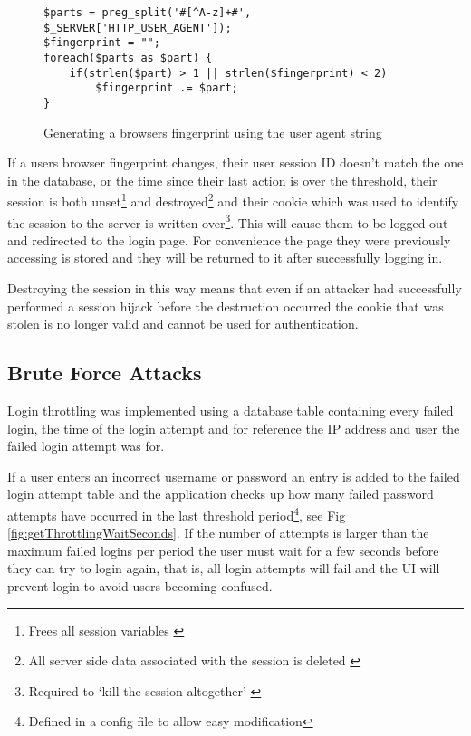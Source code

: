 \begin{figure}
\centering
\begin{lstlisting}[style=phpcolor]
$parts = preg_split('#[^A-z]+#', $_SERVER['HTTP_USER_AGENT']);
$fingerprint = "";
foreach($parts as $part) {
	if(strlen($part) > 1 || strlen($fingerprint) < 2)
		$fingerprint .= $part;
}
\end{lstlisting}
\caption{Generating a browsers fingerprint using the user agent string}
\label{fig:fingerprinting}
\end{figure}

If a users browser fingerprint changes, their user session ID doesn't match the one in the database, or the time since their last action is over the threshold, their session is both unset\footnote{Frees all session variables \parencite{php2014sessionunset}} and destroyed\footnote{All server side data associated with the session is deleted \parencite{php2014sessiondesroy}} and their cookie which was used to identify the session to the server is written over\footnote{Required to `kill the session altogether' \parencite{php2014sessiondesroy}}. This will cause them to be logged out and redirected to the login page. For convenience the page they were previously accessing is stored and they will be returned to it after successfully logging in.

Destroying the session in this way means that even if an attacker had successfully performed a session hijack before the destruction occurred the cookie that was stolen is no longer valid and cannot be used for authentication.

\subsection{Brute Force Attacks}

Login throttling was implemented using a database table containing every failed login, the time of the login attempt and for reference the IP address and user the failed login attempt was for.

If a user enters an incorrect username or password an entry is added to the failed login attempt table and the application checks up how many failed password attempts have occurred in the last threshold period\footnote{Defined in a config file to allow easy modification}, see Fig \ref{fig:getThrottlingWaitSeconds}.
%
If the number of attempts is larger than the maximum failed logins per period the user must wait for a few seconds before they can try to login again, that is, all login attempts will fail and the UI will prevent login to avoid users becoming confused.

